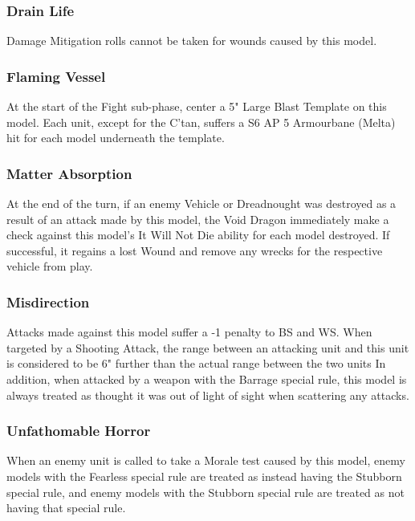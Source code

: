 \subsubsection{Drain Life} \label{Drain Life}

Damage Mitigation rolls cannot be taken for wounds caused by this model.

\subsubsection{Flaming Vessel} \label{Flaming Vessel}

At the start of the Fight sub-phase, center a 5" Large Blast Template on this model. Each unit, except for the C'tan, suffers a S6 AP 5 Armourbane (Melta) hit for each model underneath the template.
 
\subsubsection{Matter Absorption} \label{Matter Absorption}

At the end of the turn, if an enemy Vehicle or Dreadnought was destroyed as a result of an attack made by this model, the Void Dragon immediately make a check against this model's It Will Not Die ability for each model destroyed. If successful, it regains a lost Wound and remove any wrecks for the respective vehicle from play.

\subsubsection{Misdirection} \label{Misdirection}

Attacks made against this model suffer a -1 penalty to BS and WS. When targeted by a Shooting Attack, the range between an attacking unit and this unit is considered to be 6" further than the actual range between the two units In addition, when attacked by a weapon with the Barrage special rule, this model is always treated as thought it was out of light of sight when scattering any attacks.

\subsubsection{Unfathomable Horror} \label{Unfathomable Horror}

When an enemy unit is called to take a Morale test caused by this model, enemy models with the Fearless special rule are treated as instead having the Stubborn special rule, and enemy models with the Stubborn special rule are treated as not having that special rule.

